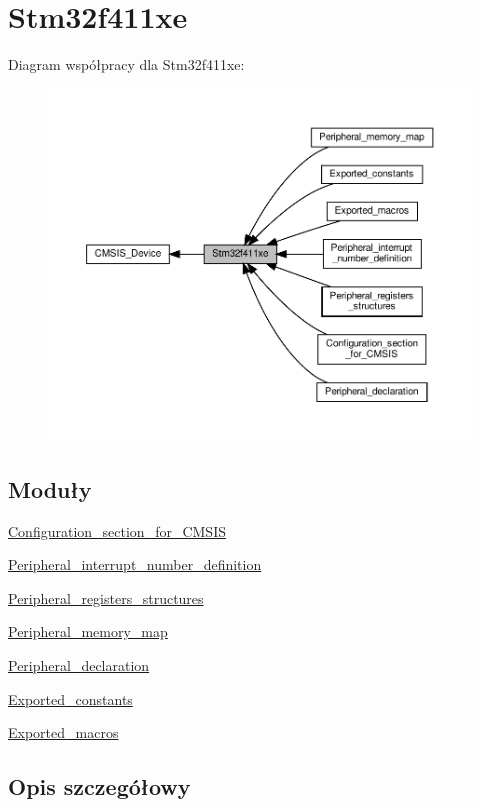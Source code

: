 \hypertarget{group__stm32f411xe}{}\section{Stm32f411xe}
\label{group__stm32f411xe}
Diagram współpracy dla Stm32f411xe\+:\nopagebreak
\begin{figure}[H]
\begin{center}
\leavevmode
\includegraphics[width=350pt]{group__stm32f411xe}
\end{center}
\end{figure}
\subsection*{Moduły}
\begin{DoxyCompactItemize}
\item 
\hyperlink{group___configuration__section__for___c_m_s_i_s}{Configuration\+\_\+section\+\_\+for\+\_\+\+C\+M\+S\+IS}
\item 
\hyperlink{group___peripheral__interrupt__number__definition}{Peripheral\+\_\+interrupt\+\_\+number\+\_\+definition}
\item 
\hyperlink{group___peripheral__registers__structures}{Peripheral\+\_\+registers\+\_\+structures}
\item 
\hyperlink{group___peripheral__memory__map}{Peripheral\+\_\+memory\+\_\+map}
\item 
\hyperlink{group___peripheral__declaration}{Peripheral\+\_\+declaration}
\item 
\hyperlink{group___exported__constants}{Exported\+\_\+constants}
\item 
\hyperlink{group___exported__macros}{Exported\+\_\+macros}
\end{DoxyCompactItemize}


\subsection{Opis szczegółowy}
